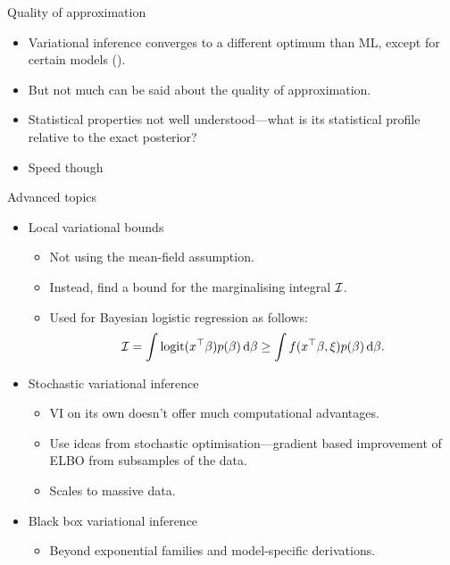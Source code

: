 \begin{frame}{Quality of approximation}
  \begin{itemize}
    \item Variational inference converges to a different optimum than ML, except for certain models (\cite{gunawardana2005convergence}).
    \item But not much can be said about the quality of approximation.
    \item Statistical properties not well understood---what is its statistical profile relative to the exact posterior?
    \item Speed though
  \end{itemize}
\end{frame}

\begin{frame}{Advanced topics}
  \begin{itemize}
    \item Local variational bounds 
    \begin{itemize}
      \item Not using the mean-field assumption.
      \item Instead, find a bound for the marginalising integral ${\mathcal I}$.
      \item Used for Bayesian logistic regression as follows:
      \[
        {\mathcal I} = \int \operatorname{logit}(x^\top\beta) p(\beta) \, \text{d}\beta \geq \int f(x^\top\beta,\xi) p(\beta) \, \text{d}\beta.
      \]
    \end{itemize}
    \item Stochastic variational inference
    \begin{itemize}
      \item VI on its own doesn't offer much computational advantages.
      \item Use ideas from stochastic optimisation---gradient based improvement of ELBO from subsamples of the data.
      \item Scales to massive data.
    \end{itemize}
    \item Black box variational inference
    \begin{itemize}
      \item Beyond exponential families and model-specific derivations.
    \end{itemize}
  \end{itemize}
\end{frame}